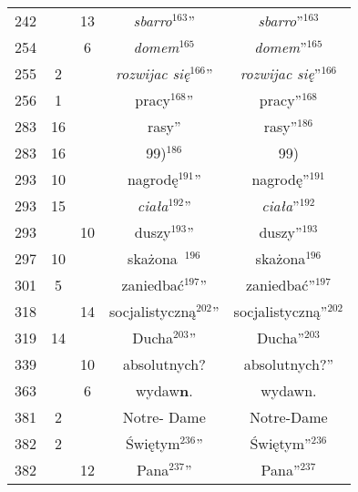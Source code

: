 \documentclass[a4paper,11pt]{article}
\begin{document}
\begin{center}
\begin{tabular}{|c|c|c|c|c|}
    242 & & 13 & \emph{sbarro}$^{ 163 }$” & \emph{sbarro}”$^{ 163 }$ \\
    254 & &  6 & \emph{domem}$^{ 165 }$ & \emph{domem}”$^{ 165 }$ \\
    255 &  2 & & \emph{rozwijac się}$^{ 166 }$”
           & \emph{rozwijac się}”$^{ 166 }$ \\
    256 &  1 & & pracy$^{ 168 }$” & pracy”$^{ 168 }$ \\
    283 & 16 & & rasy” & rasy”$^{ 186 }$ \\
    283 & 16 & & 99)$^{ 186 }$ & 99) \\
    293 & 10 & & nagrodę$^{ 191 }$” & nagrodę”$^{ 191 }$ \\
    293 & 15 & & \emph{ciała}$^{ 192 }$” & \emph{ciała}”$^{ 192 }$ \\
    293 & & 10 & duszy$^{ 193 }$” & duszy”$^{ 193 }$ \\
    297 & 10 & & skażona~$^{ 196 }$ & skażona$^{ 196 }$ \\
    301 &  5 & & zaniedbać$^{ 197 }$” & zaniedbać”$^{ 197 }$ \\
    318 & & 14 & socjalistyczną$^{ 202 }$” & socjalistyczną”$^{ 202 }$ \\
    319 & 14 & & Ducha$^{ 203 }$” & Ducha”$^{ 203 }$ \\
    339 & & 10 & absolutnych? & absolutnych?” \\
    363 & &  6 & wydaw\textbf{n}. & wydawn. \\
    381 &  2 & & Notre- Dame & Notre-Dame \\
    382 &  2 & & Świętym$^{ 236 }$” & Świętym”$^{ 236 }$ \\
    382 & & 12 & Pana$^{ 237 }$” & Pana”$^{ 237 }$ \\
    \hline
  \end{tabular}




\end{center}
\end{document}
